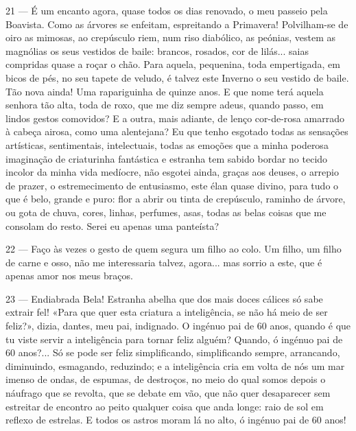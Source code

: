 21 — É um encanto agora, quase todos os dias
renovado, o meu passeio pela Boavista. Como as
árvores se enfeitam, espreitando a Primavera! 
Polvilham-se de oiro as mimosas, ao crepúsculo riem, num
riso diabólico, as peónias, vestem as magnólias os
seus vestidos de baile: brancos, rosados, cor de lilás...
saias compridas quase a roçar o chão. Para aquela,
pequenina, toda empertigada, em bicos de pés, no
seu tapete de veludo, é talvez este Inverno o seu
vestido de baile. Tão nova ainda! Uma rapariguinha de quinze anos.
E que nome terá aquela senhora tão alta, 
toda de roxo, que me diz sempre adeus,
quando passo, em lindos gestos comovidos? E a outra,
mais adiante, de lenço cor-de-rosa amarrado à cabeça
airosa, como uma alentejana? Eu que tenho esgotado
todas as sensações artísticas, sentimentais, intelectuais,
todas as emoções que a minha poderosa imaginação
de criaturinha fantástica e estranha tem sabido bordar
no tecido incolor da minha vida medíocre, não esgotei
ainda, graças aos deuses, o arrepio de prazer, o 
estremecimento de entusiasmo, este élan quase divino,
para tudo o que é belo, grande e puro: flor a abrir ou
tinta de crepúsculo, raminho de árvore, ou gota de
chuva, cores, linhas, perfumes, asas, todas as belas
coisas que me consolam do resto. Serei eu apenas uma
panteísta?

22 — Faço às vezes o gesto de quem segura um filho
ao colo. Um filho, um filho de carne e osso, não me
interessaria talvez, agora... mas sorrio a este, que é
apenas amor nos meus braços.

23 — Endiabrada Bela! Estranha abelha que dos mais
doces cálices só sabe extrair fel! «Para que quer
esta criatura a inteligência, se não há meio de ser
feliz?», dizia, dantes, meu pai, indignado. O 
ingénuo pai de 60 anos, quando é que tu viste servir a 
inteligência para tornar feliz alguém? Quando,
ó ingénuo pai de 60 anos?... Só se pode ser feliz
simplificando, simplificando sempre, arrancando, 
diminuindo, esmagando, reduzindo; e a inteligência cria
em volta de nós um mar imenso de ondas, de espumas,
de destroços, no meio do qual somos depois o 
náufrago que se revolta, que se debate em vão, que não
quer desaparecer sem estreitar de encontro ao peito
qualquer coisa que anda longe: raio de sol em reflexo
de estrelas. E todos os astros moram lá no alto, ó
ingénuo pai de 60 anos!

